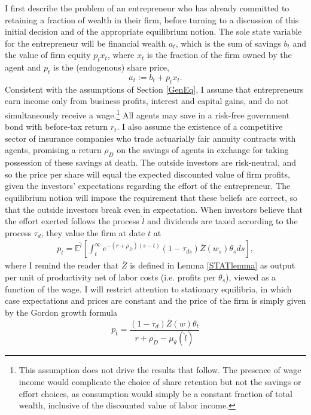 \documentclass[11pt]{article}
\theoremstyle{plain}
\begin{document}
I first describe the problem of an entrepreneur who has already committed to retaining a fraction of wealth in their firm, before turning to a discussion of this initial decision and of the appropriate equilibrium notion. The sole state variable for the entrepreneur will be financial wealth $a_t$, which is the sum of savings $b_t$ and the value of firm equity $p_tx_t$, where $x_t$ is the fraction of the firm owned by the agent and $p_t$ is the (endogenous) share price, 
\begin{equation}
a_t := b_t + p_tx_t. 
\label{totalass}
\end{equation} 
Consistent with the assumptions of Section \ref{GenEq}, I assume that entrepreneurs earn income only from business profits, interest and capital gains, and do not simultaneously receive a wage.\footnote{This assumption does not drive the results that follow. The presence of wage income would complicate the choice of share retention but not the savings or effort choices, as consumption would simply be a constant fraction of total wealth, inclusive of the discounted value of labor income.} All agents may save in a risk-free government bond with before-tax return $r_t$. I also assume the existence of a competitive sector of insurance companies who trade actuarially fair annuity contracts with agents, promising a return $\rho_D$ on the savings of agents in exchange for taking possession of these savings at death. The outside investors are risk-neutral, and so the price per share will equal the expected discounted value of firm profits, given the investors' expectations regarding the effort of the entrepreneur. The equilibrium notion will impose the requirement that these beliefs are correct, so that the outside investors break even in expectation. When investors believe that the effort exerted follows the process $\hat{l}$ and dividends are taxed according to the process $\tau_d$, they value the firm at date $t$ at
\begin{align*}
p_t = \mathbb{E}^{\hat{l}}{\left[\int_t^{\infty}e^{-(r+\rho_D)(s-t)} (1-\tau_{ds})\overline{Z}(w_s) \theta_sds\right]},
\end{align*}
where I remind the reader that $\overline{Z}$ is defined in Lemma \ref{STATlemma} as output per unit of productivity net of labor costs (i.e. profits per $\theta_s$), viewed as a function of the wage. I will restrict attention to stationary equilibria, in which case expectations and prices are constant and the price of the firm is simply given by the Gordon growth formula
\begin{equation}
p_t = \frac{(1-\tau_d)\overline{Z}(w)\theta_t}{r + \rho_D - \mu_{\theta}(\hat{l})}
\label{priceRE}
\end{equation}
\end{document}
